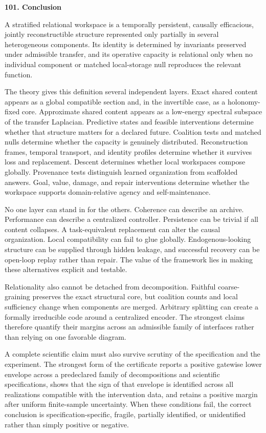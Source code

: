 \documentclass[11pt,letterpaper]{article}
\newcommand{\topic}[2]{%
 \phantomsection
 \addcontentsline{toc}{subsection}{#1. #2}%
 \vspace{0.8em}
 {\large\bfseries\color{PartColor} #1. #2\par}
 \vspace{0.15em}
}
\theoremstyle{plain}
\theoremstyle{definition}
\begin{document}
\topic{101}{Conclusion}

A stratified relational workspace is a temporally persistent, causally efficacious, jointly reconstructible
structure represented only partially in several heterogeneous components. Its identity is determined by
invariants preserved under admissible transfer, and its operative capacity is relational only when no
individual component or matched local-storage null reproduces the relevant function.

The theory gives this definition several independent layers. Exact shared content appears as a global
compatible section and, in the invertible case, as a holonomy-fixed core. Approximate shared content
appears as a low-energy spectral subspace of the transfer Laplacian. Predictive states and feasible
interventions determine whether that structure matters for a declared future. Coalition tests and matched
nulls determine whether the capacity is genuinely distributed. Reconstruction frames, temporal transport,
and identity profiles determine whether it survives loss and replacement. Descent determines whether
local workspaces compose globally. Provenance tests distinguish learned organization from scaffolded
answers. Goal, value, damage, and repair interventions determine whether the workspace supports
domain-relative agency and self-maintenance.

No one layer can stand in for the others. Coherence can describe an archive. Performance can describe a
centralized controller. Persistence can be trivial if all content collapses. A task-equivalent replacement
can alter the causal organization. Local compatibility can fail to glue globally. Endogenous-looking
structure can be supplied through hidden leakage, and successful recovery can be open-loop replay rather
than repair. The value of the framework lies in making these alternatives explicit and testable.


Relationality also cannot be detached from decomposition. Faithful
coarse-graining preserves the exact structural core, but coalition counts and
local sufficiency change when components are merged. Arbitrary splitting can
create a formally irreducible code around a centralized encoder. The strongest
claims therefore quantify their margins across an admissible family of
interfaces rather than relying on one favorable diagram.

A complete scientific claim must also survive scrutiny of the specification and the experiment.
The strongest form of the certificate reports a positive gatewise lower envelope across a predeclared
family of decompositions and scientific specifications, shows that the sign of that envelope is identified
across all realizations compatible with the intervention data, and retains a positive margin after uniform
finite-sample uncertainty. When these conditions fail, the correct conclusion is specification-specific,
fragile, partially identified, or unidentified rather than simply positive or negative.
\end{document}
